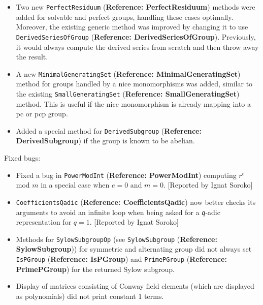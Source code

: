 \documentclass[a4paper,11pt]{report}
\begin{document}
{{\begin{itemize}
 Finally, \texttt{MutableIdentityMat} (\textbf{Reference: MutableIdentityMat}) and \texttt{MutableNullMat} (\textbf{Reference: MutableNullMat}) were explicitly declared obsolete (and may be removed in \textsf{GAP} 4.7). They actually were deprecated since \textsf{GAP} 4.1, and their use discouraged by the manual. Code using them should switch to \texttt{IdentityMat} (\textbf{Reference: IdentityMat}) respectively \texttt{NullMat} (\textbf{Reference: NullMat}). 
\item  Two new \texttt{PerfectResiduum} (\textbf{Reference: PerfectResiduum}) methods were added for solvable and perfect groups, handling these cases
optimally. Moreover, the existing generic method was improved by changing it
to use \texttt{DerivedSeriesOfGroup} (\textbf{Reference: DerivedSeriesOfGroup}). Previously, it would always compute the derived series from scratch and then
throw away the result. 
\item  A new \texttt{MinimalGeneratingSet} (\textbf{Reference: MinimalGeneratingSet}) method for groups handled by a nice monomorphisms was added, similar to the
existing \texttt{SmallGeneratingSet} (\textbf{Reference: SmallGeneratingSet}) method. This is useful if the nice monomorphism is already mapping into a pc
or pcp group. 
\item  Added a special method for \texttt{DerivedSubgroup} (\textbf{Reference: DerivedSubgroup}) if the group is known to be abelian. 
\end{itemize}
 Fixed bugs: 
\begin{itemize}
\item  Fixed a bug in \texttt{PowerModInt} (\textbf{Reference: PowerModInt}) computing $r^e$ mod $m$ in a special case when $e=0$ and $m=0$. [Reported by Ignat Soroko] 
\item  \texttt{CoefficientsQadic} (\textbf{Reference: CoefficientsQadic}) now better checks its arguments to avoid an infinite loop when being asked for
a \mbox{\texttt{\mdseries\slshape q}}-adic representation for $q=1$. [Reported by Ignat Soroko] 
\item  Methods for \texttt{SylowSubgroupOp} (see \texttt{SylowSubgroup} (\textbf{Reference: SylowSubgroup})) for symmetric and alternating group did not always set \texttt{IsPGroup} (\textbf{Reference: IsPGroup}) and \texttt{PrimePGroup} (\textbf{Reference: PrimePGroup}) for the returned Sylow subgroup. 
\item  Display of matrices consisting of Conway field elements (which are displayed
as polynomials) did not print constant 1 terms. 

\end{itemize}}}
\end{document}
